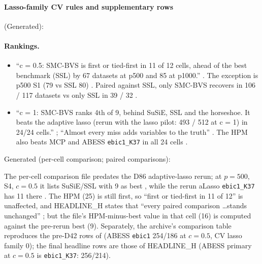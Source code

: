 \paragraph{Lasso-family CV rules and supplementary rows} (Generated):



\paragraph{Rankings.} 
\begin{itemize}
\item ``c = 0.5: SMC-BVS is first or tied-first in 11 of 12 cells, ahead of the best benchmark (SSL) by 67 datasets at p500 and 85
at p1000.'' . The exception is p500 S1 (79 vs SSL 80)
. Paired against SSL, only SMC-BVS recovers in 106 / 117
datasets vs only SSL in 39 / 32 .
\item ``c = 1: SMC-BVS ranks 4th of 9, behind SuSiE, SSL and the horseshoe. It beats the adaptive lasso (rerun with the lasso
pilot: 493 / 512 at c = 1) in 24/24 cells.'' ; ``Almost every miss adds variables to the truth''
. The HPM also beats MCP and ABESS \texttt{ebic1\_K37} in all 24
cells .
\end{itemize}
Generated (per-cell comparison; paired comparisons):



\begin{uncertain}
The per-cell comparison file predates the D86 adaptive-lasso rerun; at $p=500$, S4, $c=0.5$ it lists SuSiE/SSL with 9 as best
, while the rerun aLasso
\texttt{ebic1\_K37} has 11 there . The HPM (25) is still first, so
``first or tied-first in 11 of 12'' is unaffected, and HEADLINE\_H states that ``every paired comparison \dots stands unchanged''
; but the file's HPM-minus-best value in that cell (16)
is computed against the pre-rerun best (9). Separately, the archive's comparison table
 reproduces the pre-D42 rows of
 (ABESS \texttt{ebic1} 254/186 at $c=0.5$, CV lasso family 0); the final
headline rows are those of HEADLINE\_H (ABESS primary at $c=0.5$ is \texttt{ebic1\_K37}: 256/214).
\end{uncertain}

